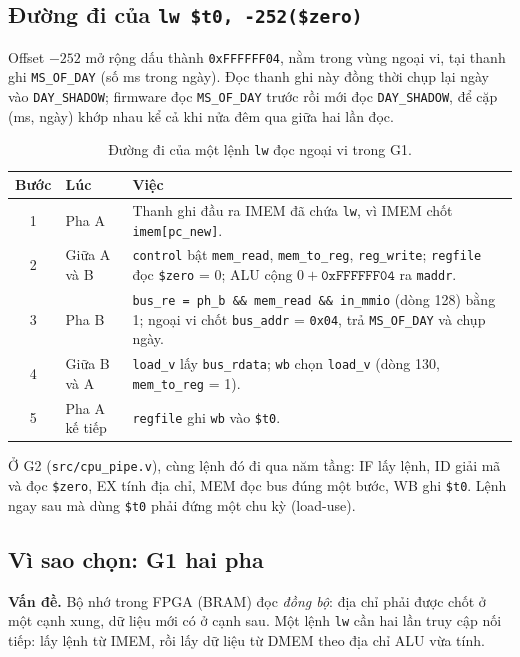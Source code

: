 \subsection{Đường đi của \texttt{lw \$t0, -252(\$zero)}}
Offset $-252$ mở rộng dấu thành \texttt{0xFFFFFF04}, nằm trong vùng ngoại vi, tại thanh ghi \texttt{MS\_OF\_DAY} (số ms trong ngày). Đọc thanh ghi này đồng thời chụp lại ngày vào \texttt{DAY\_SHADOW}; firmware đọc \texttt{MS\_OF\_DAY} trước rồi mới đọc \texttt{DAY\_SHADOW}, để cặp (ms, ngày) khớp nhau kể cả khi nửa đêm qua giữa hai lần đọc.

\begin{table}[htbp]
\centering\small
\begin{tabular}{@{}c l p{9cm}@{}}
\toprule
Bước & Lúc & Việc \\
\midrule
1 & Pha A & Thanh ghi đầu ra IMEM đã chứa \texttt{lw}, vì IMEM chốt \texttt{imem[pc\_new]}. \\
2 & Giữa A và B & \texttt{control} bật \texttt{mem\_read}, \texttt{mem\_to\_reg}, \texttt{reg\_write}; \texttt{regfile} đọc \texttt{\$zero} = 0; ALU cộng $0 + \texttt{0xFFFFFF04}$ ra \texttt{maddr}. \\
3 & Pha B & \texttt{bus\_re = ph\_b \&\& mem\_read \&\& in\_mmio} (dòng 128) bằng 1; ngoại vi chốt \texttt{bus\_addr} = \texttt{0x04}, trả \texttt{MS\_OF\_DAY} và chụp ngày. \\
4 & Giữa B và A & \texttt{load\_v} lấy \texttt{bus\_rdata}; \texttt{wb} chọn \texttt{load\_v} (dòng 130, \texttt{mem\_to\_reg} = 1). \\
5 & Pha A kế tiếp & \texttt{regfile} ghi \texttt{wb} vào \texttt{\$t0}. \\
\bottomrule
\end{tabular}
\caption{Đường đi của một lệnh \texttt{lw} đọc ngoại vi trong G1.}\label{tab:lw}
\end{table}

Ở G2 (\texttt{src/cpu\_pipe.v}), cùng lệnh đó đi qua năm tầng: IF lấy lệnh, ID giải mã và đọc \texttt{\$zero}, EX tính địa chỉ, MEM đọc bus đúng một bước, WB ghi \texttt{\$t0}. Lệnh ngay sau mà dùng \texttt{\$t0} phải đứng một chu kỳ (load-use).

\subsection{Vì sao chọn: G1 hai pha}\label{sec:vi-sao-2pha}
\textbf{Vấn đề.} Bộ nhớ trong FPGA (BRAM) đọc \emph{đồng bộ}: địa chỉ phải được chốt ở một cạnh xung, dữ liệu mới có ở cạnh sau. Một lệnh \texttt{lw} cần hai lần truy cập nối tiếp: lấy lệnh từ IMEM, rồi lấy dữ liệu từ DMEM theo địa chỉ ALU vừa tính.

